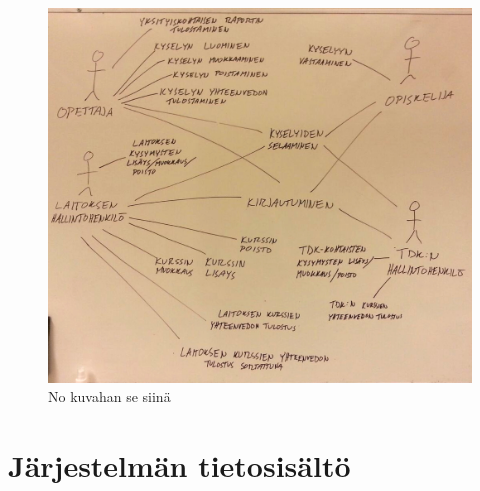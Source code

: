 \documentclass[12pt,a4paper,titlepage]{article}
\begin{document}



\begin{figure}
   \centering
   \includegraphics[width=\textwidth]{kuvat/kayttotapauskaavio.jpg}
   \caption{No kuvahan se siinä}\label{fig:kayttotapauskaavio}
\end{figure}




\section{Järjestelmän tietosisältö}
\end{document}

